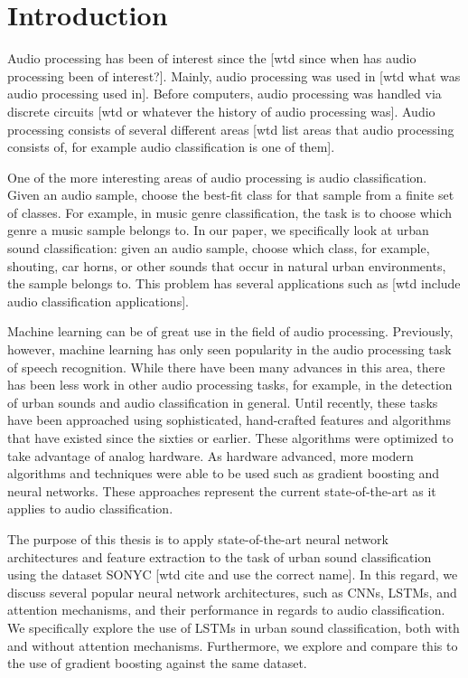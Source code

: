 \chapter{Introduction}
\label{Introduction}

Audio processing has been of interest since the [wtd since when has audio processing been of interest?].  Mainly, audio processing was used in [wtd what was audio processing used in].  Before computers, audio processing was handled via discrete circuits [wtd or whatever the history of audio processing was].  Audio processing consists of several different areas [wtd list areas that audio processing consists of, for example audio classification is one of them].

One of the more interesting areas of audio processing is audio classification.  Given an audio sample, choose the best-fit class for that sample from a finite set of classes.  For example, in music genre classification, the task is to choose which genre a music sample belongs to.  In our paper, we specifically look at urban sound classification: given an audio sample, choose which class, for example, shouting, car horns, or other sounds that occur in natural urban environments, the sample belongs to.  This problem has several applications such as [wtd include audio classification applications].

Machine learning can be of great use in the field of audio processing.  Previously, however, machine learning has only seen popularity in the audio processing task of speech recognition.  While there have been many advances in this area, there has been less work in other audio processing tasks, for example, in the detection of urban sounds and audio classification in general.  Until recently, these tasks have been approached using sophisticated, hand-crafted features and algorithms that have existed since the sixties or earlier.  These algorithms were optimized to take advantage of analog hardware.  As hardware advanced, more modern algorithms and techniques were able to be used such as gradient boosting and neural networks.  These approaches represent the current state-of-the-art as it applies to audio classification.

The purpose of this thesis is to apply state-of-the-art neural network architectures and feature extraction to the task of urban sound classification using the dataset SONYC [wtd cite and use the correct name].  In this regard, we discuss several popular neural network architectures, such as CNNs, LSTMs, and attention mechanisms, and their performance in regards to audio classification.  We specifically explore the use of LSTMs in urban sound classification, both with and without attention mechanisms.  Furthermore, we explore and compare this to the use of gradient boosting against the same dataset.

